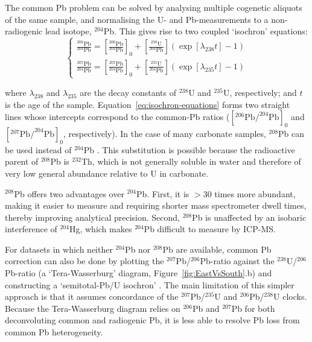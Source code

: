 \documentclass[11pt]{article}
\begin{document}
The common Pb problem can be solved by analysing multiple cogenetic
aliquots of the same sample, and normalising the U- and
Pb-measurements to a non-radiogenic lead isotope, ${}^{204}$Pb. This
gives rise to two coupled `isochron' equations:
\begin{equation}
  \begin{cases}
    \frac{{}^{206}\mbox{Pb}}{{}^{204}\mbox{Pb}} =
    \left[\frac{{}^{206}\mbox{Pb}}{{}^{204}\mbox{Pb}}\right]_0 +
    \left[\frac{{}^{238}\mbox{U}}{{}^{204}\mbox{Pb}}\right]\left(\exp[\lambda_{238}t]-1\right) \\
    \frac{{}^{207}\mbox{Pb}}{{}^{204}\mbox{Pb}} =
    \left[\frac{{}^{207}\mbox{Pb}}{{}^{204}\mbox{Pb}}\right]_0 +
    \left[\frac{{}^{235}\mbox{U}}{{}^{204}\mbox{Pb}}\right]\left(\exp[\lambda_{235}t]-1\right)
  \end{cases}
  \label{eq:isochron-equations}
\end{equation}

\noindent where $\lambda_{238}$ and $\lambda_{235}$ are the decay
constants of ${}^{238}$U and ${}^{235}$U, respectively; and $t$ is the
age of the sample.  Equation~\ref{eq:isochron-equations} forms two
straight lines whose intercepts correspond to the common-Pb ratios
($[^{206}\mbox{Pb}{/}^{204}\mbox{Pb}]_0$ and
$[^{207}\mbox{Pb}{/}^{204}\mbox{Pb}]_0$, respectively). In the case of
many carbonate samples, ${}^{208}$Pb can be used instead of
${}^{204}$Pb \citep{parrish2018}. This substitution is possible
because the radioactive parent of ${}^{208}$Pb is ${}^{232}$Th, which
is not generally soluble in water and therefore of very low general
abundance relative to U in carbonate.

$^{208}$Pb offers two advantages over ${}^{204}$Pb. First, it is $>30$
times more abundant, making it easier to measure and requiring shorter
mass spectrometer dwell times, thereby improving analytical
precision. Second, $^{208}$Pb is unaffected by an isobaric
interference of ${}^{204}$Hg, which makes ${}^{204}$Pb difficult to
measure by ICP-MS.

For datasets in which neither $^{204}$Pb nor $^{208}$Pb are available,
common Pb correction can also be done by plotting the
$^{207}$Pb/$^{206}$Pb-ratio against the $^{238}$U/$^{206}$Pb-ratio (a
`Tera-Wasserburg' diagram, Figure~\ref{fig:EastVsSouth}.b) and
constructing a `semitotal-Pb/U isochron' \citep{ludwig1998}.  The main
limitation of this simpler approach is that it assumes concordance of
the $^{207}$Pb/$^{235}$U and $^{206}$Pb/$^{238}$U clocks. Because the
Tera-Wasserburg diagram relies on $^{206}$Pb and $^{207}$Pb for both
deconvoluting common and radiogenic Pb, it is less able to resolve Pb
loss from common Pb heterogeneity.
\end{document}
